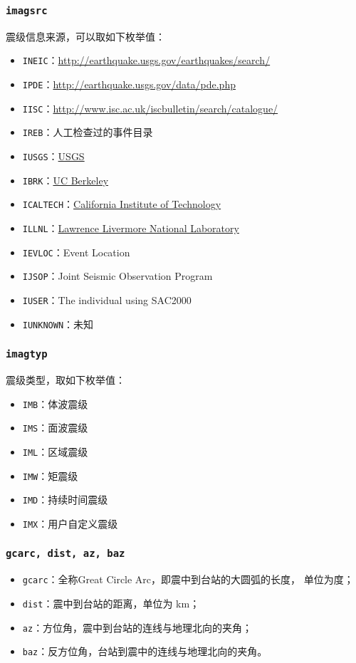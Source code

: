 \subsubsection{\texttt{imagsrc}}
震级信息来源，可以取如下枚举值：
\begin{itemize}
\item \texttt{INEIC}：\url{http://earthquake.usgs.gov/earthquakes/search/}
\item \texttt{IPDE}：\url{http://earthquake.usgs.gov/data/pde.php}
\item \texttt{IISC}：\url{http://www.isc.ac.uk/iscbulletin/search/catalogue/}
\item \texttt{IREB}：人工检查过的事件目录
\item \texttt{IUSGS}：\href{http://earthquake.usgs.gov}{USGS}
\item \texttt{IBRK}：\href{http://seismo.berkeley.edu/}{UC Berkeley}
\item \texttt{ICALTECH}：\href{http://www.seismolab.caltech.edu}{California Institute of Technology}
\item \texttt{ILLNL}：\href{https://www.llnl.gov/}{Lawrence Livermore National Laboratory}
\item \texttt{IEVLOC}：Event Location
\item \texttt{IJSOP}：Joint Seismic Observation Program
\item \texttt{IUSER}：The individual using SAC2000
\item \texttt{IUNKNOWN}：未知
\end{itemize}

\subsubsection{\texttt{imagtyp}}
震级类型，取如下枚举值：
\begin{itemize}
\item \texttt{IMB}：体波震级
\item \texttt{IMS}：面波震级
\item \texttt{IML}：区域震级
\item \texttt{IMW}：矩震级
\item \texttt{IMD}：持续时间震级
\item \texttt{IMX}：用户自定义震级
\end{itemize}

\subsubsection{\texttt{gcarc, dist, az, baz}}
\begin{itemize}
\item \texttt{gcarc}：全称Great Circle Arc，即震中到台站的大圆弧的长度，
    单位为度；
\item \texttt{dist}：震中到台站的距离，单位为 \si{\km}；
\item \texttt{az}：方位角，震中到台站的连线与地理北向的夹角；
\item \texttt{baz}：反方位角，台站到震中的连线与地理北向的夹角。
\end{itemize}

